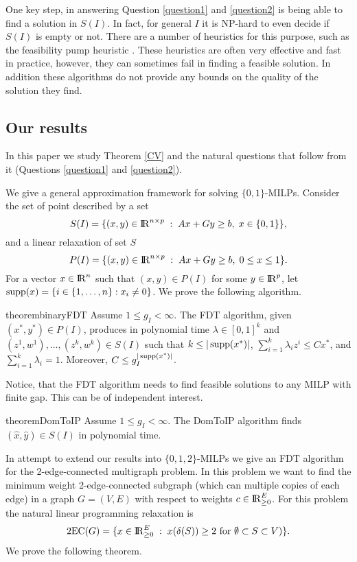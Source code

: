 \documentclass[runningheads]{llncs}
\begin{document}
One key step, in answering Question \ref{question1} and \ref{question2} is being able to find a solution in $S(I)$. In fact, for general $I$ it is NP-hard to even decide if $S(I)$ is empty or not. There are a number of heuristics for this purpose, such as the feasibility pump heuristic \cite{fp1,fp2}. These heuristics are often very effective and fast in practice, however, they can sometimes fail in finding a feasible solution. In addition these algorithms do not provide any bounds on the quality of the solution they find.
\subsection{Our results}
In this paper we study Theorem \ref{CV} and the natural questions that follow from it (Questions \ref{question1} and \ref{question2}).

We give a general approximation framework for solving $\{0,1\}$-MILPs.  Consider the set of point described by a set 
\begin{equation}
S(I)= \{(x,y)\in {\rm I\!R}^{n\times p}\;:\; Ax+Gy\geq b,\; x\in \{0,1\}\},  \label{S'}
\end{equation}
and a linear relaxation of set $S$
\begin{equation}
P(I) = \{(x,y)\in {\rm I\!R}^{n\times p}\;:\; Ax+Gy\geq b,\; 0 \leq x\leq 1\}. \label{P'}
\end{equation}
For a vector $x\in {\rm I\!R}^n$ such that $(x,y)\in P(I)$ for some $y\in {\rm I\!R}^p$, let $\operatorname{supp}(x)= \{i \in \{1,\ldots,n\}: x_i \neq 0\}$.  We prove the following algorithm.

\begin{restatable}{theorem}{binaryFDT}
	\label{binaryFDT}
	Assume $1\leq g_I 	<\infty$. 	
	The FDT algorithm, given $(x^*,y^*)\in P(I)$, produces in polynomial time $\lambda\in [0,1]^k$ and $(z^1,w^1),\ldots,(z^k,w^k) \in S(I)$ such that $k\leq |\operatorname{supp}(x^*)|$, $\sum_{i=1}^{k}\lambda_i z^i\leq Cx^*$, and $\sum_{i=1}^{k}\lambda_i = 1$. Moreover, $C\leq g_I^{|\operatorname{supp}(x^*)|}$.
\end{restatable}

Notice, that the FDT algorithm needs to find feasible solutions to any MILP with finite gap. This can be of independent interest.
\begin{restatable}{theorem}{DomToIP}
	\label{domtoIP}
	Assume $1\leq g_I < \infty$. The DomToIP algorithm finds $(\hat{x},\hat{y})\in S(I)$ in polynomial time.
\end{restatable}

In attempt to extend our results into $\{0,1,2\}$-MILPs we give an FDT algorithm for the 2-edge-connected multigraph problem. In this problem we want to find the minimum weight 2-edge-connected subgraph (which can multiple copies of each edge) in a graph $G=(V,E)$ with respect to weights $c\in {\rm I\!R}^E_{\geq 0}$. For this problem the natural linear programming relaxation is
\begin{equation}\label{2ECpol}
\operatorname{2EC}(G)= \{x\in {\rm I\!R}_{\geq 0}^{E}\;:\; x(\delta(S))\geq 2 \text{ for $\emptyset \subset S\subset V$})\}.\end{equation}
We prove the following theorem.
\end{document}
